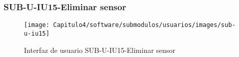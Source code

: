 \subsubsection{SUB-U-IU15-Eliminar sensor}\label{SUB-U-IU15}
\begin{figure}[H]
	\centering
	\texttt{[image: Capitulo4/software/submodulos/usuarios/images/sub-u-iu15]}
	\caption{Interfaz de usuario SUB-U-IU15-Eliminar sensor}
	\label{fig:sub-u-iu15}
\end{figure}